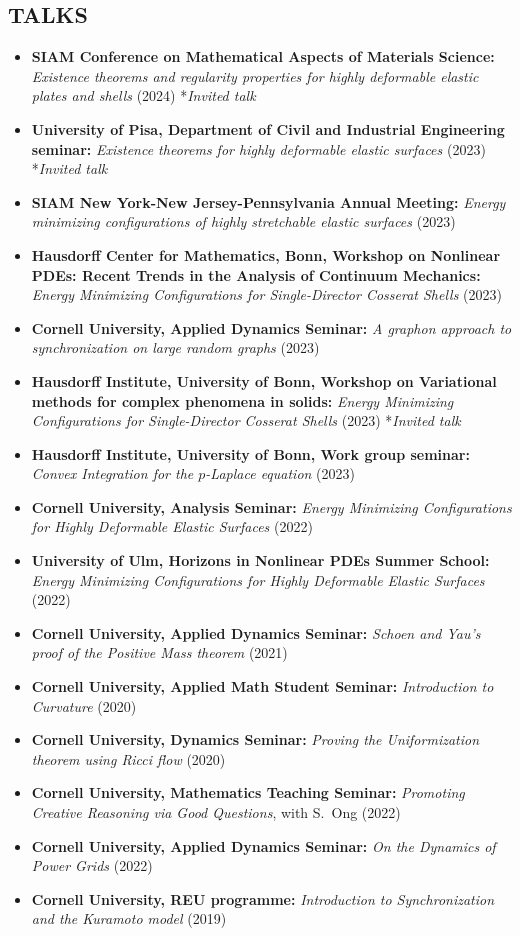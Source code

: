 \documentclass[margin]{res} %
\begin{document}
\begin{resume}
\section{TALKS}
\begin{itemize}
	\item \textbf{SIAM Conference on Mathematical Aspects of Materials Science:} \textit{Existence theorems and regularity properties for highly deformable elastic plates and shells} (2024) *\textit{Invited talk}
	\item \textbf{University of Pisa, Department of Civil and Industrial Engineering seminar:} \textit{Existence theorems for highly deformable elastic surfaces} (2023) *\textit{Invited talk}
	\item \textbf{SIAM New York-New Jersey-Pennsylvania Annual Meeting:} \textit{Energy minimizing configurations of highly stretchable elastic surfaces} (2023)
	\item \textbf{Hausdorff Center for Mathematics, Bonn, Workshop on Nonlinear PDEs: Recent Trends in the Analysis of Continuum Mechanics:} \textit{Energy Minimizing Configurations for Single-Director Cosserat Shells} (2023) 
	\item \textbf{Cornell University, Applied Dynamics Seminar:} \textit{A graphon approach to synchronization on large random graphs} (2023)
	\item \textbf{Hausdorff Institute, University of Bonn, Workshop on Variational methods for complex phenomena in solids:} \textit{Energy Minimizing Configurations for Single-Director Cosserat Shells} (2023) *\textit{Invited talk}
	\item \textbf{Hausdorff Institute, University of Bonn, Work group seminar:} \textit{Convex Integration for the $p$-Laplace equation} (2023)
	\item \textbf{Cornell University, Analysis Seminar:} \textit{Energy Minimizing Configurations for Highly Deformable Elastic Surfaces} (2022)
	\item \textbf{University of Ulm, Horizons in Nonlinear PDEs Summer School:} \textit{Energy Minimizing Configurations for Highly Deformable Elastic Surfaces} (2022)
	\item \textbf{Cornell University, Applied Dynamics Seminar:} \textit{Schoen and Yau's proof of the Positive Mass theorem} (2021)
	\item \textbf{Cornell University, Applied Math Student Seminar:} \textit{Introduction to Curvature} (2020)
	\item \textbf{Cornell University, Dynamics Seminar:} \textit{Proving the Uniformization theorem using Ricci flow} (2020)
	\item \textbf{Cornell University, Mathematics Teaching Seminar:} \textit{Promoting Creative Reasoning via Good Questions}, with S.~Ong (2022)
	\item \textbf{Cornell University, Applied Dynamics Seminar:} \textit{On the Dynamics of Power Grids} (2022)
	\item \textbf{Cornell University, REU programme:} \textit{Introduction to Synchronization and the Kuramoto model} (2019)
\end{itemize}


\end{resume}
\end{document}
